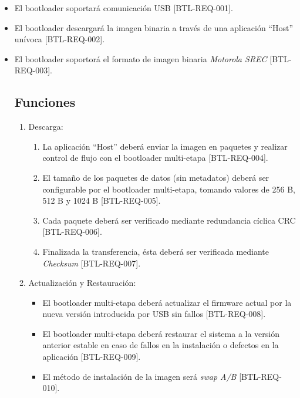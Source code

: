 \documentclass[12pt,a4paper]{article}
\begin{document}
\begin{itemize}
	\item El bootloader soportará comunicación USB [BTL-REQ-001].
	
	\item El bootloader descargará la imagen binaria a través de una aplicación ``Host'' unívoca [BTL-REQ-002].
	
	\item El bootloader soportorá el formato de imagen binaria \textit{Motorola SREC} [BTL-REQ-003].
\begin{itemize}


\subsection{Funciones}
\label{sec:functions}

\begin{enumerate}
	\item Descarga:
		\begin{enumerate}
			\item La aplicación ``Host'' deberá enviar la imagen en paquetes y realizar control de flujo con el bootloader multi-etapa [BTL-REQ-004].
			
			\item El tamaño de los paquetes de datos (sin metadatos) deberá ser configurable por el bootloader multi-etapa, tomando valores de 256 B, 512 B y 1024 B [BTL-REQ-005].
			
			\item Cada paquete deberá ser verificado mediante redundancia cíclica CRC [BTL-REQ-006].
			
			\item Finalizada la transferencia, ésta deberá ser verificada mediante \textit{Checksum} [BTL-REQ-007].
		\end{enumerate}
		
	\item Actualización y Restauración:
		\begin{itemize}
			\item El bootloader multi-etapa deberá actualizar el firmware actual por la nueva versión introducida por USB sin fallos [BTL-REQ-008].
			
			\item El bootloader multi-etapa deberá restaurar el sistema a la versión anterior estable en caso de fallos en la instalación o defectos en la aplicación [BTL-REQ-009].
			
			\item El método de instalación de la imagen será \textit{swap A/B} [BTL-REQ-010].
		\end{itemize}
		

\end{enumerate}
\end{itemize}
\end{itemize}
\end{document}
